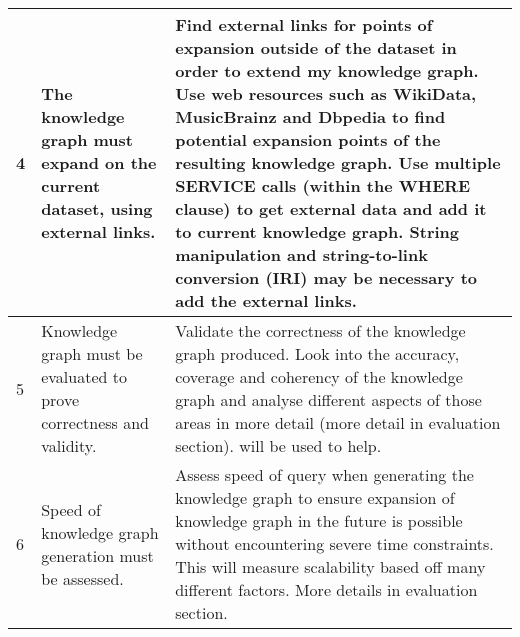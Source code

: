 \begin{longtable}{|p{2.25cm}|p{5.5cm}|p{5.5cm}|}
4&
The knowledge graph must expand on the current dataset, using external links. &
Find external links for points of expansion outside of the dataset in order to extend my knowledge graph. Use web resources such as WikiData, MusicBrainz and Dbpedia to find potential expansion points of the resulting knowledge graph. Use multiple SERVICE calls (within the WHERE clause) to get external data and add it to current knowledge graph. String manipulation and string-to-link conversion (IRI) may be necessary to add the external links. \\
\hline

5&
Knowledge graph must be evaluated to prove correctness and validity. &
Validate the correctness of the knowledge graph produced. Look into the accuracy, coverage and coherency of the knowledge graph and analyse different aspects of those areas in more detail (more detail in evaluation section). \cite{knowledgegraphevaulationbook} will be used to help. \\ 
\hline

6&
Speed of knowledge graph generation must be assessed. &
Assess speed of query when generating the knowledge graph to ensure expansion of knowledge graph in the future is possible without encountering severe time constraints. This will measure scalability based off many different factors. More details in evaluation section. 
\hline
\end{longtable}


